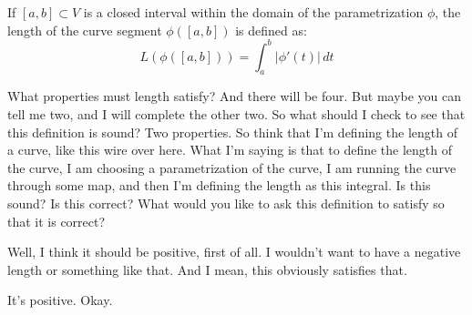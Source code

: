 \begin{math-stroke}
\begin{definition}
If $[a,b] \subset V$ is a closed interval within the domain of the parametrization $\phi$, the length of the curve segment $\phi([a,b])$ is defined as:
\[
L(\phi([a,b])) = \int_a^b |\phi'(t)| \, dt
\]
\end{definition}
\begin{center}
\end{center}
\end{math-stroke}

\begin{spoken-clean}[08:38 - 11:46]
What properties must length satisfy? And there will be four. But maybe you can tell me two, and I will complete the other two. So what should I check to see that this definition is sound? Two properties. So think that I'm defining the length of a curve, like this wire over here. What I'm saying is that to define the length of the curve, I am choosing a parametrization of the curve, I am running the curve through some map, and then I'm defining the length as this integral. Is this sound? Is this correct? What would you like to ask this definition to satisfy so that it is correct?
\end{spoken-clean}

\begin{student-question}
Well, I think it should be positive, first of all. I wouldn't want to have a negative length or something like that. And I mean, this obviously satisfies that.
\end{student-question}

\begin{spoken-clean}[10:20 - 10:22]
It's positive. Okay.
\end{spoken-clean}

